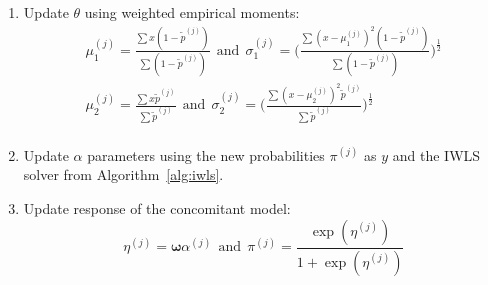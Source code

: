 \documentclass[article,nojss,shortnames]{jss}
\begin{document}
\begin{algorithm}
\begin{enumerate}
            
        \item Update $\mathit{\theta}$ using weighted empirical moments:
            \begin{equation*}
                \begin{split}
                    \mu_1^{(j)} = \frac{\sum \mathit{x} (1 - \tilde{p}^{(j)})}{\sum (1 - \tilde{p}^{(j)})}
                    ~~\text{and}~~
                    \sigma_1^{(j)} = \Big( \frac{\sum (x - \mu_1^{(j)})^2 (1 - \tilde{p}^{(j)})}{\sum(1 - \tilde{p}^{(j)})} \Big)^\frac{1}{2} \\
                    \mu_2^{(j)} = \frac{\sum \mathit{x} \tilde{p}^{(j)}}{\sum \tilde{p}^{(j)}}
                    ~~\text{and}~~
                    \sigma_2^{(j)} = \Big( \frac{\sum (x - \mu_2^{(j)})^2 \tilde{p}^{(j)}}{\sum \tilde{p}^{(j)}} \Big)^\frac{1}{2} \\
                \end{split}
            \end{equation*}

        \item Update $\mathit{\alpha}$ parameters using the new probabilities $\pi^{(j)}$
            as $\mathit{y}$ and the IWLS solver from Algorithm~\ref{alg:iwls}.

        \item Update response of the concomitant model:
            \begin{equation*}
                \mathit{\eta}^{(j)} = \mathbf{\omega}\mathit{\alpha}^{(j)}
                ~~\text{and}~~
                \mathit{\pi}^{(j)} = \frac{\exp(\mathit{\eta}^{(j)})}{1 + \exp(\mathit{\eta}^{(j)})}
            \end{equation*}


\end{enumerate}
\end{algorithm}
\end{document}
